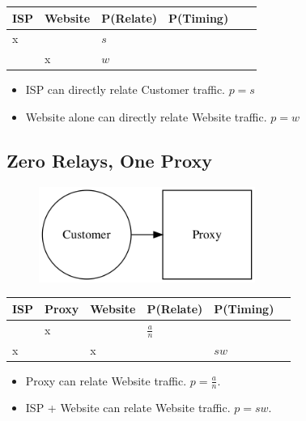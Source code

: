 \documentclass{article}
\begin{document}
\begin{center}
\begin{tabular}{l | l | l | l | l | l}
  ISP & Website & P(Relate)          & P(Timing) \\
  \hline
  x   &         & $s$                & \\
  \hline
      & x       & $w$                & \\
\end{tabular}
\end{center}

\begin{itemize}
\item ISP can directly relate Customer traffic. $p = s$
\item Website alone can directly relate Website traffic. $p = w$
\end{itemize}

\subsection{Zero Relays, One Proxy}

\begin{figure}[htbp]
  \centering
  \includegraphics[width = 200pt]{sc}
  \caption{}
\end{figure}

\begin{center}
\begin{tabular}{l | l | l | l | l | l}
  ISP & Proxy & Website & P(Relate)          & P(Timing) \\
  \hline
      & x     &         & $\frac{a}{n}$      & \\
  \hline
  x   &       & x       &                    & $sw$ \\
\end{tabular}
\end{center}

\begin{itemize}
\item Proxy can relate Website traffic. $p = \frac{a}{n}$.
\item ISP + Website can relate Website traffic. $p = sw$.
\end{itemize}
\end{document}
